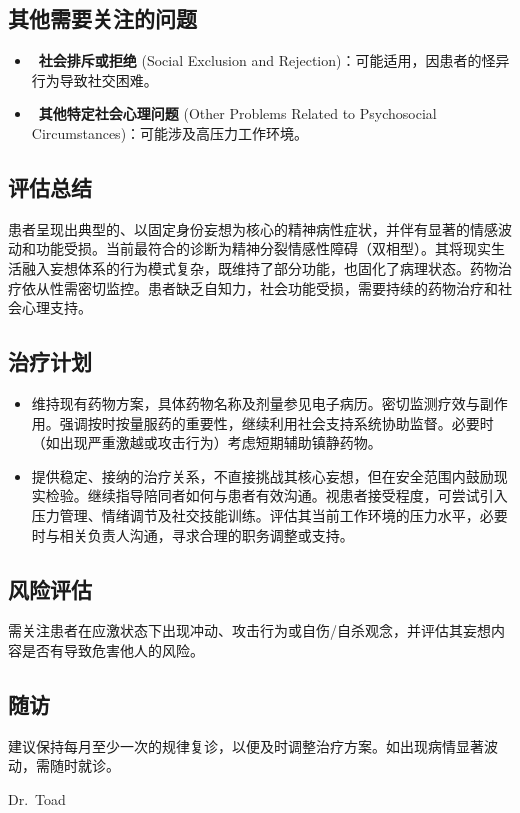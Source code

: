 \subsection*{其他需要关注的问题}
\begin{itemize}
\item{} ~\textbf{社会排斥或拒绝} (Social Exclusion and Rejection)：可能适用，因患者的怪异行为导致社交困难。
\item{} ~\textbf{其他特定社会心理问题} (Other Problems Related to Psychosocial Circumstances)：可能涉及高压力工作环境。
\end{itemize}

\subsection*{评估总结}
患者呈现出典型的、以固定身份妄想为核心的精神病性症状，并伴有显著的情感波动和功能受损。当前最符合的诊断为精神分裂情感性障碍（双相型）。其将现实生活融入妄想体系的行为模式复杂，既维持了部分功能，也固化了病理状态。药物治疗依从性需密切监控。患者缺乏自知力，社会功能受损，需要持续的药物治疗和社会心理支持。

\subsection*{治疗计划}

\begin{itemize}
\item{} 维持现有药物方案，具体药物名称及剂量参见电子病历。密切监测疗效与副作用。强调按时按量服药的重要性，继续利用社会支持系统协助监督。必要时（如出现严重激越或攻击行为）考虑短期辅助镇静药物。
\item{} 提供稳定、接纳的治疗关系，不直接挑战其核心妄想，但在安全范围内鼓励现实检验。继续指导陪同者如何与患者有效沟通。视患者接受程度，可尝试引入压力管理、情绪调节及社交技能训练。评估其当前工作环境的压力水平，必要时与相关负责人沟通，寻求合理的职务调整或支持。
\end{itemize}

\subsection*{风险评估}
需关注患者在应激状态下出现冲动、攻击行为或自伤/自杀观念，并评估其妄想内容是否有导致危害他人的风险。

\subsection*{随访}
建议保持每月至少一次的规律复诊，以便及时调整治疗方案。如出现病情显著波动，需随时就诊。

\halfline\hfill{} {\large\stylish Dr.~Toad}
